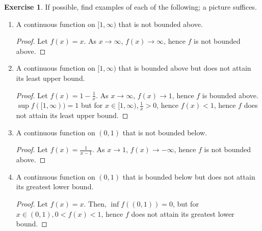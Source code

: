 \documentclass[11pt]{article}
\renewcommand{\_}[1]{\underline{ #1 }}
\theoremstyle{definition}
\newtheorem{exercise}[theorem]{Exercise}
\numberwithin{equation}{subsection}
\begin{document}
\begin{exercise} If possible, find examples of each of the following; a picture suffices. 
\begin{enumerate}
\item[a)] A continuous function on $[1,\infty)$ that is not bounded above.

\begin{proof}
Let $f(x)=x$. As $x \rightarrow \infty$, $f(x) \rightarrow \infty$, hence $f$ is not bounded above.



\renewcommand\qedsymbol{QED}
\end{proof}



\item[b)] A continuous function on $[1,\infty)$ that is bounded above but does not attain its least upper bound.

\begin{proof}
Let $f(x) = 1 - \frac{1}{x}$. As $x \rightarrow \infty$, $f(x) \rightarrow 1$, hence $f$ is bounded above. $\sup f([1,\infty))=1$ but for $x \in [1, \infty), \frac{1}{x}>0$, hence $f(x)<1$, hence $f$ does not attain its least upper bound.



\renewcommand\qedsymbol{QED}
\end{proof}


\item[c)] A continuous function on $(0,1)$ that is not bounded below.

\begin{proof}

Let $f(x) = \frac{1}{x-1}$. As $x \rightarrow 1$, $f(x) \rightarrow - \infty$, hence $f$ is not bounded above.


\renewcommand\qedsymbol{QED}
\end{proof}


\item[d)]  A continuous function on $(0,1)$ that is bounded below but does not attain its greatest lower bound.

\begin{proof}

Let $f(x) = x$. Then, $\inf f((0,1))=0$, but for $x \in (0,1), 0<f(x)<1$, hence $f$ does not attain its greatest lower bound.


\renewcommand\qedsymbol{QED}
\end{proof}


\end{enumerate}
\end{exercise}
\end{document}
